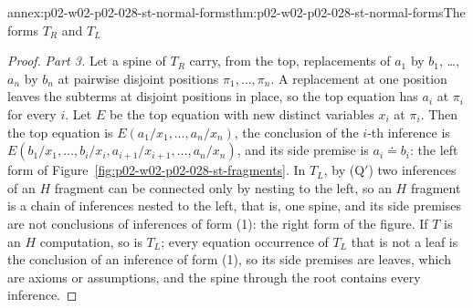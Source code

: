 \begin{annexitem}{annex:p02-w02-p02-028-st-normal-forms}{thm:p02-w02-p02-028-st-normal-forms}{The forms \(T_R\) and \(T_L\)}
\begin{proof}
\emph{Part 3.}  Let a spine of \(T_R\) carry, from the top, replacements of
\(a_1\) by \(b_1\), \ldots, \(a_n\) by \(b_n\) at pairwise disjoint positions
\(\pi_1,\ldots,\pi_n\).  A replacement at one position leaves the subterms
at disjoint positions in place, so the top equation has \(a_i\) at \(\pi_i\)
for every \(i\).  Let \(E\) be the top equation with new distinct variables
\(x_i\) at \(\pi_i\).  Then the top equation is
\(E(a_1/x_1,\ldots,a_n/x_n)\), the conclusion of the \(i\)-th inference is
\(E(b_1/x_1,\ldots,b_i/x_i,a_{i+1}/x_{i+1},\ldots,a_n/x_n)\), and its side
premise is \(a_i\doteq b_i\): the left form of
Figure~\ref{fig:p02-w02-p02-028-st-fragments}.  In \(T_L\), by (Q\('\)) two
inferences of an \(H\) fragment can be connected only by nesting to the
left, so an \(H\) fragment is a chain of inferences nested to the left, that
is, one spine, and its side premises are not conclusions of inferences of
form (1): the right form of the figure.  If \(T\) is an \(H\) computation, so
is \(T_L\); every equation occurrence of \(T_L\) that is not a leaf is the
conclusion of an inference of form (1), so its side premises are leaves,
which are axioms or assumptions, and the spine through the root contains
every inference.
\end{proof}
\end{annexitem}

